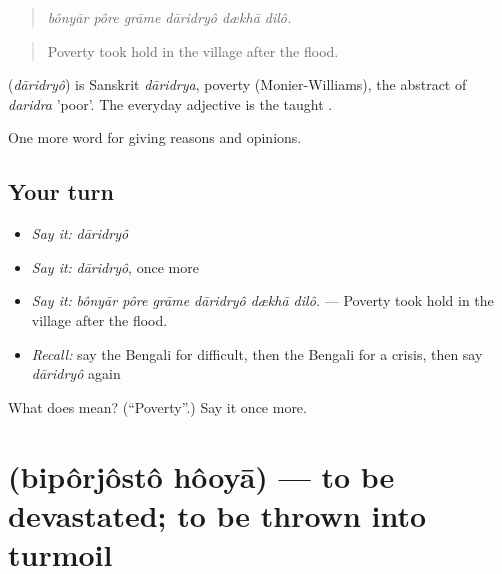 \begin{quote}
     
\end{quote}

\begin{quote}
\emph{bônyār pôre grāme dāridryô dækhā dilô.}
\end{quote}

\begin{quote}
Poverty took hold in the village after the flood.
\end{quote}

\begin{cousinweb}
\textbf{} (\emph{dāridryô}) is Sanskrit \emph{dāridrya}, poverty (Monier-Williams), the abstract of \emph{daridra} 'poor'. The everyday adjective is the taught .
\end{cousinweb}

\begin{grammarlens}[title={What you've built}]
One more word for giving reasons and opinions.
\end{grammarlens}

\subsection*{Your turn}
\begin{itemize}
\raggedright
  \item \emph{Say it:} \emph{dāridryô}
  \item \emph{Say it:} \emph{dāridryô}, once more
  \item \emph{Say it:} \emph{bônyār pôre grāme dāridryô dækhā dilô.} — Poverty took hold in the village after the flood.
  \item \emph{Recall:} say the Bengali for difficult, then the Bengali for a crisis, then say \emph{dāridryô} again
\end{itemize}

\begin{tcolorbox}[breakable,colback=teal!4,colframe=teal!35!black,title={Before you move on}]
What does  mean? (\textquotedblleft{}Poverty\textquotedblright{}.) Say it once more.
\end{tcolorbox}
\section[\texorpdfstring{\bn{বিপর্যস্ত} \bn{হওয়া} (bipôrjôstô hôoyā)}{বিপর্যস্ত হওয়া (bipôrjôstô hôoyā)}]{  (bipôrjôstô hôoyā) — to be devastated; to be thrown into turmoil}

